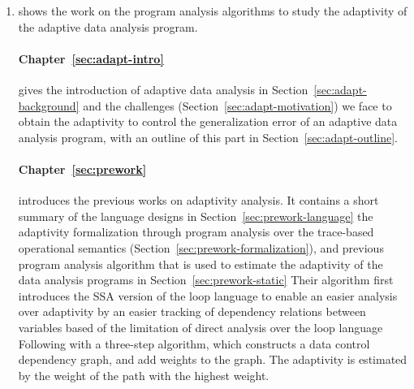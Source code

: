 \begin{enumerate}
    \item {}
    shows the work on the program analysis algorithms to study the adaptivity of the adaptive data analysis program.    

    \paragraph{Chapter~\ref{sec:adapt-intro}} gives the introduction of adaptive data analysis in Section~\ref{sec:adapt-background} and the challenges (Section~\ref{sec:adapt-motivation}) we face to obtain the adaptivity to control the generalization error of an adaptive data analysis program, with an outline of this part in Section~\ref{sec:adapt-outline}.
    
    \paragraph{Chapter~\ref{sec:prework}} introduces the previous works on adaptivity analysis.
    It contains a short summary of the language designs in Section~\ref{sec:prework-language} 
    the adaptivity formalization through program analysis over the trace-based operational semantics (Section~\ref{sec:prework-formalization}),
    and previous program analysis algorithm that is used to estimate the adaptivity of the data analysis programs 
    in Section~\ref{sec:prework-static}
    Their algorithm first introduces the SSA version of the loop language
     to enable an easier analysis over adaptivity by an easier tracking of dependency relations between variables based of the limitation of direct analysis over the loop language
    Following with a three-step algorithm, which constructs a data control dependency graph, and add weights to the graph. The adaptivity is estimated by the weight of the path with the highest weight.



\end{enumerate}
